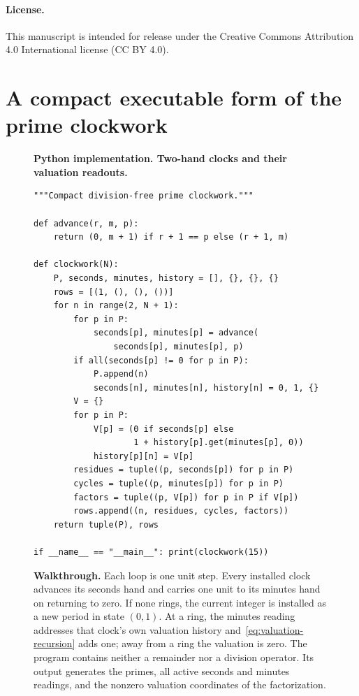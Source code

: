 \documentclass[11pt,a4paper]{article}
\theoremstyle{clockplain}
\theoremstyle{definition}
\theoremstyle{remark}
\begin{document}
\paragraph{License.}
This manuscript is intended for release under the Creative Commons Attribution 4.0 International license (CC BY 4.0).

\appendix
\section{A compact executable form of the prime clockwork}
\label{app:python}

\begin{figure}[H]
\centering
\begin{minipage}{0.96\textwidth}
\textbf{Python implementation. Two-hand clocks and their valuation readouts.}
\begin{lstlisting}[style=clockpython]
"""Compact division-free prime clockwork."""

def advance(r, m, p):
    return (0, m + 1) if r + 1 == p else (r + 1, m)

def clockwork(N):
    P, seconds, minutes, history = [], {}, {}, {}
    rows = [(1, (), (), ())]
    for n in range(2, N + 1):
        for p in P:
            seconds[p], minutes[p] = advance(
                seconds[p], minutes[p], p)
        if all(seconds[p] != 0 for p in P):
            P.append(n)
            seconds[n], minutes[n], history[n] = 0, 1, {}
        V = {}
        for p in P:
            V[p] = (0 if seconds[p] else
                    1 + history[p].get(minutes[p], 0))
            history[p][n] = V[p]
        residues = tuple((p, seconds[p]) for p in P)
        cycles = tuple((p, minutes[p]) for p in P)
        factors = tuple((p, V[p]) for p in P if V[p])
        rows.append((n, residues, cycles, factors))
    return tuple(P), rows

if __name__ == "__main__": print(clockwork(15))
\end{lstlisting}
\vspace{1mm}
\textbf{Walkthrough.} Each loop is one unit step. Every installed clock advances its seconds hand and carries one unit to its minutes hand on returning to zero. If none rings, the current integer is installed as a new period in state $(0,1)$. At a ring, the minutes reading addresses that clock's own valuation history and~\eqref{eq:valuation-recursion} adds one; away from a ring the valuation is zero. The program contains neither a remainder nor a division operator. Its output generates the primes, all active seconds and minutes readings, and the nonzero valuation coordinates of the factorization.


\end{minipage}
\end{figure}
\end{document}
